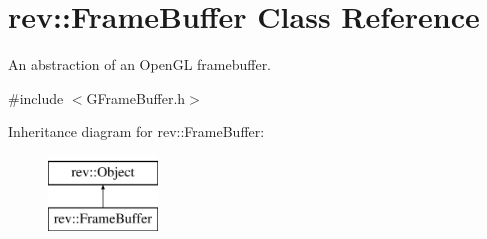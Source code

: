 \hypertarget{classrev_1_1_frame_buffer}{}\section{rev\+::Frame\+Buffer Class Reference}
\label{classrev_1_1_frame_buffer}


An abstraction of an Open\+GL framebuffer.  




{\ttfamily \#include $<$G\+Frame\+Buffer.\+h$>$}

Inheritance diagram for rev\+::Frame\+Buffer\+:\begin{figure}[H]
\begin{center}
\leavevmode
\includegraphics[height=2.000000cm]{classrev_1_1_frame_buffer}
\end{center}
\end{figure}
